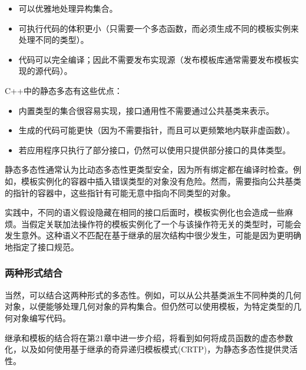 \begin{itemize}
\item 
可以优雅地处理异构集合。

\item 
可执行代码的体积更小（只需要一个多态函数，而必须生成不同的模板实例来处理不同的类型）。

\item 
代码可以完全编译；因此不需要发布实现源（发布模板库通常需要发布模板实现的源代码）。
\end{itemize}

C++中的静态多态有这些优点：

\begin{itemize}
\item 
内置类型的集合很容易实现，接口通用性不需要通过公共基类来表示。

\item 
生成的代码可能更快（因为不需要指针，而且可以更频繁地内联非虚函数）。

\item 
若应用程序只执行了部分接口，仍然可以使用只提供部分接口的具体类型。
\end{itemize}

静态多态性通常认为比动态多态性更类型安全，因为所有绑定都在编译时检查。例如，模板实例化的容器中插入错误类型的对象没有危险。然而，需要指向公共基类的指针的容器中，这些指针有可能无意中指向不同类型的对象。

实践中，不同的语义假设隐藏在相同的接口后面时，模板实例化也会造成一些麻烦。当假定关联加法操作符的模板实例化了一个与该操作符无关的类型时，可能会发生意外。这种语义不匹配在基于继承的层次结构中很少发生，可能是因为更明确地指定了接口规范。

\subsubsection{两种形式结合}

当然，可以结合这两种形式的多态性。例如，可以从公共基类派生不同种类的几何对象，以便能够处理几何对象的异构集合。但仍然可以使用模板，为特定类型的几何对象编写代码。

继承和模板的结合将在第21章中进一步介绍，将看到如何将成员函数的虚态参数化，以及如何使用基于继承的奇异递归模板模式(CRTP)，为静态多态性提供灵活性。




























